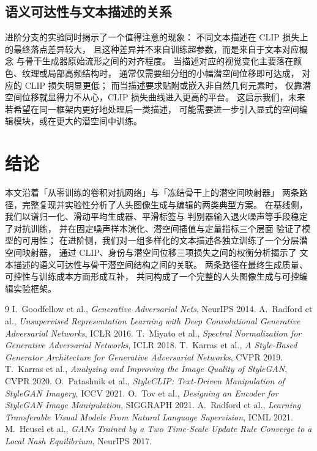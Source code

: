 \documentclass[11pt,a4paper]{ctexart}
\begin{document}
\subsection{语义可达性与文本描述的关系}
进阶分支的实验同时揭示了一个值得注意的现象：
不同文本描述在 CLIP 损失上的最终落点差异较大，
且这种差异并不来自训练超参数，而是来自于文本对应概念
与骨干生成器原始流形之间的对齐程度。
当描述对应的视觉变化主要落在颜色、纹理或局部高频结构时，
通常仅需要细分组的小幅潜空间位移即可达成，
对应的 CLIP 损失明显更低；
而当描述要求贴附或嵌入非自然几何元素时，
仅靠潜空间位移就显得力不从心，CLIP 损失曲线进入更高的平台。
这启示我们，未来若希望在同一框架内更好地处理后一类描述，
可能需要进一步引入显式的空间编辑模块，或在更大的潜空间中训练。

\section{结论}
本文沿着「从零训练的卷积对抗网络」与「冻结骨干上的潜空间映射器」
两条路径，完整复现并实验性分析了人头图像生成与编辑的两类典型方案。
在基线侧，我们以谱归一化、滑动平均生成器、平滑标签与
判别器输入退火噪声等手段稳定了对抗训练，
并在固定噪声样本演化、潜空间插值与定量指标三个层面
验证了模型的可用性；
在进阶侧，我们对一组多样化的文本描述各独立训练了一个分层潜空间映射器，
通过 CLIP、身份与潜空间位移三项损失之间的权衡分析揭示了
文本描述的语义可达性与骨干潜空间结构之间的关联。
两条路径在最终生成质量、可控性与训练成本方面形成互补，
共同构成了一个完整的人头图像生成与可控编辑实验框架。

\begin{thebibliography}{9}
\small
{} I.~Goodfellow et al.,
\emph{Generative Adversarial Nets}, NeurIPS 2014.
 A.~Radford et al.,
\emph{Unsupervised Representation Learning with Deep Convolutional Generative Adversarial Networks}, ICLR 2016.
 T.~Miyato et al.,
\emph{Spectral Normalization for Generative Adversarial Networks}, ICLR 2018.
 T.~Karras et al.,
\emph{A Style-Based Generator Architecture for Generative Adversarial Networks}, CVPR 2019.
 T.~Karras et al.,
\emph{Analyzing and Improving the Image Quality of StyleGAN}, CVPR 2020.
 O.~Patashnik et al.,
\emph{StyleCLIP: Text-Driven Manipulation of StyleGAN Imagery}, ICCV 2021.
 O.~Tov et al.,
\emph{Designing an Encoder for StyleGAN Image Manipulation}, SIGGRAPH 2021.
 A.~Radford et al.,
\emph{Learning Transferable Visual Models From Natural Language Supervision}, ICML 2021.
 M.~Heusel et al.,
\emph{GANs Trained by a Two Time-Scale Update Rule Converge to a Local Nash Equilibrium}, NeurIPS 2017.
\end{thebibliography}
\end{document}
